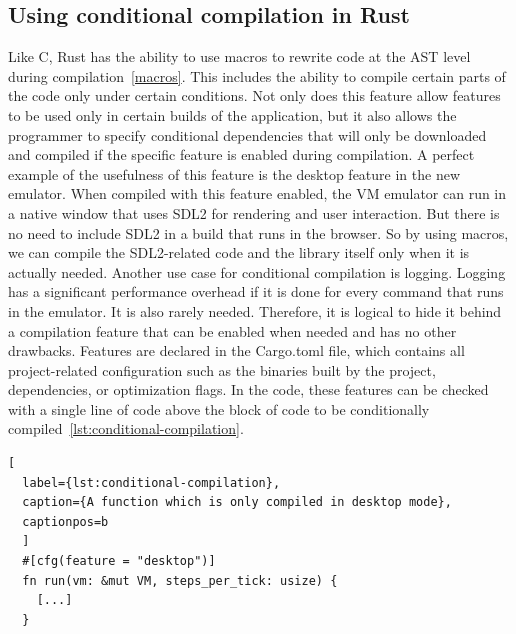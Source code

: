 \subsection{Using conditional compilation in Rust} \label{conditional-compilation}
Like C, Rust has the ability to use macros to rewrite code at the AST level during compilation~\ref{macros}. This includes the ability to compile certain parts of the code only under certain conditions.
Not only does this feature allow features to be used only in certain builds of the application, but it also allows the programmer to specify conditional dependencies that will only be downloaded and compiled if the specific feature is enabled during compilation.
A perfect example of the usefulness of this feature is the desktop feature in the new emulator. When compiled with this feature enabled, the VM emulator can run in a native window that uses SDL2 for rendering and user interaction.
But there is no need to include SDL2 in a build that runs in the browser. So by using macros, we can compile the SDL2-related code and the library itself only when it is actually needed.
Another use case for conditional compilation is logging. Logging has a significant performance overhead if it is done for every command that runs in the emulator. It is also rarely needed. Therefore, it is logical to hide it behind a compilation feature that can be enabled when needed and has no other drawbacks. Features are declared in the Cargo.toml file, which contains all project-related configuration such as the binaries built by the project, dependencies, or optimization flags.
In the code, these features can be checked with a single line of code above the block of code to be conditionally compiled~\ref{lst:conditional-compilation}.

\begin{lstlisting}[
  label={lst:conditional-compilation},
  caption={A function which is only compiled in desktop mode},
  captionpos=b
  ]
  #[cfg(feature = "desktop")]
  fn run(vm: &mut VM, steps_per_tick: usize) {
    [...]
  }
\end{lstlisting}
